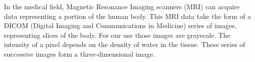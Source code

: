 In the medical field, Magnetic Resonance Imaging scanners (MRI) can acquire data representing a portion of the human body. This MRI data take the form of a DICOM (Digital Imaging and Communications in Medicine) series of images, representing slices of the body. For our use those images are grayscale. The intensity of a pixel depends on the density of water in the tissue. These series of successive images form a three-dimensional image.

